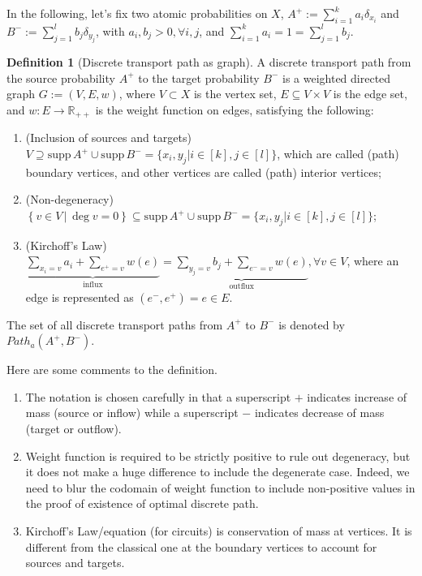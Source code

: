 \documentclass[fleqn]{article}
\theoremstyle{definition}
\newtheorem{defn}[thm]{Definition}
\theoremstyle{remark}
\newcommand{\supp}{\mathrm{supp}\,} %
\begin{document}
\par
In the following, let's fix two atomic probabilities on $X$, $A^+ :=\sum_{i=1}^k a_i \delta_{x_i}$ and $B^- :=\sum_{j=1}^l b_j \delta_{y_j}$, with $a_i,b_j>0, \forall i,j$, and $\sum_{i=1}^k a_i=1=\sum_{j=1}^l b_j$.

\begin{defn}[Discrete transport path as graph]
A discrete transport path from the source probability $A^+$ to the target probability $B^-$ is a weighted directed graph $G:=(V,E,w)$, where $V\subset X$ is the vertex set, $E\subseteq V\times V$ is the edge set, and $w:E\rightarrow\mathbb{R}_{++}$ is the weight function on edges, satisfying the following:
\begin{enumerate}	
	\item (Inclusion of sources and targets) $V \supseteq \supp A^+ \cup \supp B^- = \{x_i,y_j | i\in[k], j\in[l]\}$, which are called (path) boundary vertices, and other vertices are called (path) interior vertices;
	\item (Non-degeneracy) $\left\{ v\in V \,\big|\, \deg v=0 \right\} \subseteq \supp A^+ \cup \supp B^- = \{x_i,y_j | i\in[k], j\in[l]\}$;
    \item (Kirchoff's Law) $\underbrace{\sum_{x_i=v} a_i + \sum_{e^+=v} w(e)}_{\textrm{influx}} = \underbrace{\sum_{y_j=v} b_j + \sum_{e^-=v} w(e)}_{\textrm{outflux}}, \forall v\in V$, where an edge is represented as $(e^-,e^+)=e\in E$.
\end{enumerate}
The set of all discrete transport paths from $A^+$ to $B^-$ is denoted by $Path_a(A^+,B^-)$.
\end{defn}

Here are some comments to the definition.
\begin{enumerate}
	\item The notation is chosen carefully in that a superscript $+$ indicates increase of mass (source or inflow) while a superscript $-$ indicates decrease of mass (target or outflow).
	\item Weight function is required to be strictly positive to rule out degeneracy, but it does not make a huge difference to include the degenerate case. Indeed, we need to blur the codomain of weight function to include non-positive values in the proof of existence of optimal discrete path.
	\item Kirchoff's Law/equation (for circuits) is conservation of mass at vertices. It is different from the classical one at the boundary vertices to account for sources and targets.
\end{enumerate}
\end{document}
